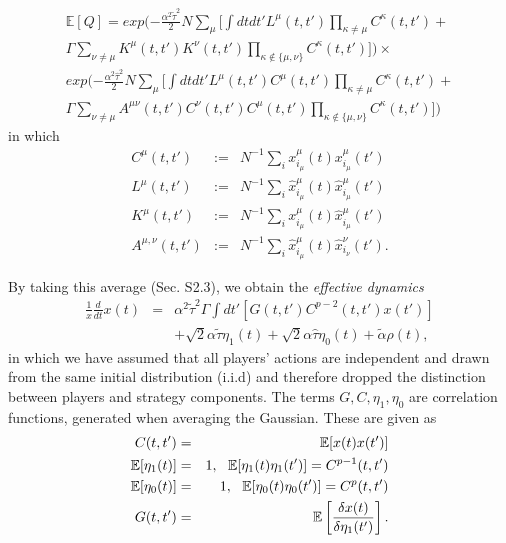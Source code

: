 \documentclass[sigconf,anonymous]{aamas}
\newcommand{\xmu}[2]{x_{#1_#2}^{#2}(t)}
\newcommand{\xmudash}[2]{x_{#1_#2}^{#2}(t')}
\newcommand{\hxmu}[1]{\hat{x}_{#1_\mu}^{\mu} (t)}
\newcommand{\hxmudash}[1]{\hat{x}_{#1_\mu}^{\mu} (t')}
\newcommand{\hxnudash}[1]{\hat{x}_{#1_\nu}^{\nu} (t')}
\newcommand{\talpha}{\tilde{\alpha}}
\newcommand{\ttau}{\tilde{\tau}}
\newcommand{\htau}{\hat{\tau}}
\begin{document}
%
\begin{equation}
\begin{split}
        \mathbb{E}[Q] = exp(- \frac{\alpha^2 \ttau ^2}{2} N \sum_{\mu} \Big [ \int dt dt' L^\mu(t, t') \prod_{\kappa \neq \mu} C^\kappa (t, t') + \\ \Gamma \sum_{\nu \neq \mu} K^\mu (t, t') K^\nu (t, t') \prod_{\kappa \not\in \{\mu, \nu\}} C^\kappa (t, t') \Big ] ) \times \\
        exp(- \frac{\alpha^2 \htau ^2}{2} N \sum_{\mu} \Big [ \int dt dt' L^\mu(t, t') C^\mu (t, t') \prod_{\kappa \neq \mu} C^\kappa (t, t') + \\ \Gamma \sum_{\nu \neq \mu} A^{\mu \nu} (t, t') C^\nu (t, t') C^\mu (t, t') \prod_{\kappa \not\in \{\mu, \nu\}} C^\kappa (t, t') \Big ] )
\end{split}
\end{equation}
%
in which
%
\begin{eqnarray*}
\label{eqn::correlations}
        C^\mu (t, t') &  := & N^{-1} \sum_i \xmu{i}{\mu} \xmudash{i}{\mu} \\
        L^\mu (t, t') & :=  & N^{-1} \sum_i \hxmu{i} \hxmudash{i} \\
        K^\mu (t, t') & :=  & N^{-1} \sum_i \xmu{i}{\mu} \hxmudash{i} \\
        A^{\mu, \nu} (t, t') & := &  N^{-1} \sum_i \hxmu{i} \hxnudash{i}.
\end{eqnarray*}

By taking this average (Sec. S2.3), we obtain the \textit{effective dynamics}
%
\begin{eqnarray}
    \label{eqn::EffectiveDynamics}
            \frac{1}{x} \frac{d}{dt} x(t) & = & \alpha^2 \ttau^2 \Gamma \int dt' \left [G(t, t')C^{p - 2}(t, t') x(t') \right ] \nonumber \\ && + \sqrt{2} \alpha \ttau \eta_1(t) + \sqrt{2} \alpha \htau \eta_0(t) + \talpha \rho(t), 
\end{eqnarray}
%
in which we have assumed that all players' actions are independent and drawn from the same initial distribution (i.i.d)
and therefore dropped the distinction between players and strategy components. The terms $G, C, \eta_1, \eta_0$ are correlation functions, generated when averaging the Gaussian. These are given as 
%
\begin{eqnarray*}
        C(t, t') & = & \mathbb{E}[x(t) x(t')] \\
        \mathbb{E}[\eta_1(t)] & = & 1, \text{ \space } \mathbb{E}[\eta_1(t) \eta_1(t')]  =  C^{p-1}(t, t') \\
        \mathbb{E}[\eta_0(t)] & = & 1, \text{ \space } \mathbb{E}[\eta_0(t) \eta_0(t')] = C^{p}(t, t') \\
        G(t, t') & = & \mathbb{E}\left [ \frac{\delta x(t)}{ \delta \eta_1(t')} \right].
\end{eqnarray*}
\end{document}
